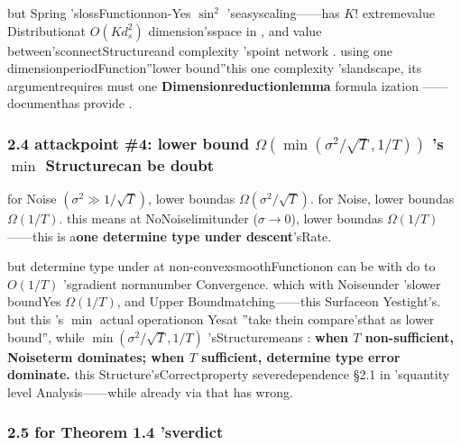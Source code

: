 \documentclass[
  12pt,
]{article}
\begin{document}
but  Spring 'slossFunctionnon-Yes \(\sin^2\) 'seasyscaling------has  \(K!\)
extremevalue Distributionat  \(O(K d_s^2)\)
dimension'sspace in , and value between'sconnectStructureand complexity 'spoint network . using one dimensionperiodFunction''lower bound''this one complexity 'slandscape, its argumentrequires must one \textbf{Dimensionreductionlemma }formula ization ------documenthas provide . 

\subsubsection{\texorpdfstring{2.4 attackpoint  \#4: lower bound
\(\Omega(\min(\sigma^2/\sqrt{T}, 1/T))\) 's \(\min\)
Structurecan be doubt}{2.4 attackpoint  \#4: lower bound \textbackslash Omega(\textbackslash min(\textbackslash sigma\^{}2/\textbackslash sqrt\{T\}, 1/T)) 's \textbackslash min Structurecan be doubt}}\label{ux653bux51fbux70b9-4ux4e0bux754c-omegaminsigma2sqrtt-1t-ux7684-min-ux7ed3ux6784ux53efux7591}

for Noise \((\sigma^2 \gg 1/\sqrt{T})\), lower boundas 
\(\Omega(\sigma^2/\sqrt{T})\). for Noise, lower boundas 
\(\Omega(1/T)\). this means at NoNoiselimitunder (\(\sigma \to 0\)), lower boundas 
\(\Omega(1/T)\)------this is a\textbf{one determine type under descent}'sRate. 

but determine type under at non-convexsmoothFunctionon can be with do to  \(O(1/T)\)
'sgradient normnumber Convergence. which with Noiseunder 'slower boundYes
\(\Omega(1/T)\), and Upper Boundmatching------this Surfaceon Yestight's. but this 's \(\min\)
actual operationon Yesat ''take thein compare'sthat as lower bound'', while 
\(\min(\sigma^2/\sqrt{T}, 1/T)\) 'sStructuremeans : \textbf{when  \(T\)
non-sufficient, Noiseterm dominates; when  \(T\) sufficient, determine type error dominate. }
this Structure'sCorrectproperty severedependence §2.1
in 'squantity level Analysis------while already via that has wrong. 

\subsubsection{2.5 for  Theorem 1.4
'sverdict}\label{ux5bf9-theorem-1.4-ux7684ux5224ux51b3}
\end{document}
